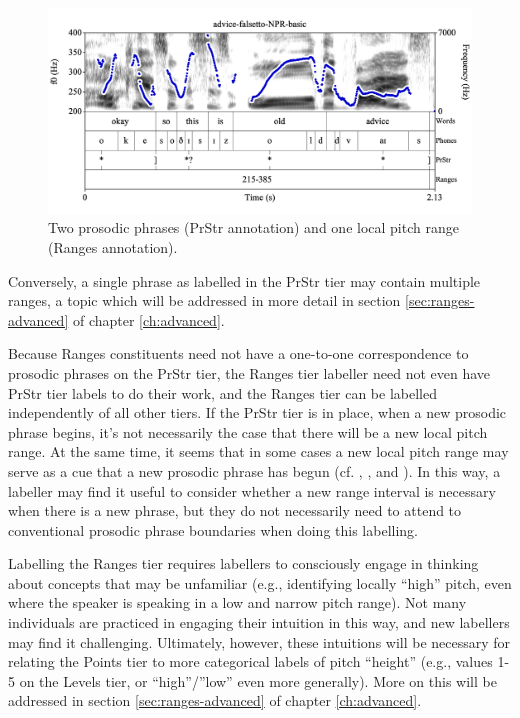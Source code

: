 \documentclass[11pt, twoside]{memoir}
\begin{document}
\begin{figure}[H]
\centering
%
\includegraphics[width=.875\linewidth]{Ranges-advice-falsetto-basic-first-range.png}
%
\caption{Two prosodic phrases (PrStr annotation) and one local pitch range (Ranges annotation).%
\label{fig:advice-falsetto PrStr Ranges basic}%
%
%
}
\end{figure}

Conversely, a single phrase as labelled in the PrStr tier may contain multiple ranges, a topic which will be addressed in more detail in section \ref{sec:ranges-advanced} of chapter \ref{ch:advanced}.

Because Ranges constituents need not have a one-to-one correspondence to prosodic phrases on the PrStr tier, the Ranges tier labeller need not even have PrStr tier labels to do their work, and the Ranges tier can be labelled independently of all other tiers. If the PrStr tier is in place, when a new prosodic phrase begins, it’s not necessarily the case that there will be a new local pitch range. At the same time, it seems that in some cases a new local pitch range may serve as a cue that a new prosodic phrase has begun (cf. \citealt{brugos15}, \citealt{brugos-18}, and \citealt{kim20}). In this way, a labeller may find it useful to consider whether a new range interval is necessary when there is a new phrase, but they do not necessarily need to attend to conventional prosodic phrase boundaries when doing this labelling.

Labelling the Ranges tier requires labellers to consciously engage in thinking about concepts that may be unfamiliar (e.g., identifying locally “high” pitch, even where the speaker is speaking in a low and narrow pitch range). Not many individuals are practiced in engaging their intuition in this way, and new labellers may find it challenging. Ultimately, however, these intuitions will be necessary for relating the Points tier to more categorical labels of pitch “height” (e.g., values 1-5 on the Levels tier, or “high”\slash ”low” even more generally). More on this will be addressed in section \ref{sec:ranges-advanced} of chapter \ref{ch:advanced}.
\end{document}
